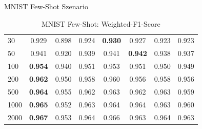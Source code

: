 \documentclass[10pt, compress]{beamer}
\begin{document}
\begin{frame}{MNIST Few-Shot Szenario}
\begin{table}[hbt]
{\begin{tabular}{l|c|c|c|c|c|c|c}
30                                                                & 0.929          & 0.898 & 0.924          & \textbf{0.930} & 0.927                                                           & 0.923                                                           & 0.923          \\
50                                                                & 0.941          & 0.920 & 0.939          & 0.941          & \textbf{0.942}                                                  & 0.938                                                           & 0.937          \\
100                                                               & \textbf{0.954} & 0.940 & 0.951          & 0.953          & 0.951                                                           & 0.950                                                           & 0.949          \\
200                                                               & \textbf{0.962} & 0.950 & 0.958          & 0.960          & 0.956                                                           & 0.958                                                           & 0.956          \\
500                                                               & \textbf{0.964} & 0.955 & 0.962          & 0.963          & 0.962                                                           & 0.963                                                           & 0.959          \\
1000                                                              & \textbf{0.965} & 0.952 & 0.963          & 0.964          & 0.964                                                           & 0.963                                                           & 0.960          \\
2000                                                              & \textbf{0.967} & 0.953 & 0.964          & 0.966          & 0.963                                                           & 0.964                                                           & 0.963          \\
\bottomrule
\end{tabular}}
\caption{MNIST Few-Shot: Weighted-F1-Score}
\end{table}
\end{frame}
\end{document}
